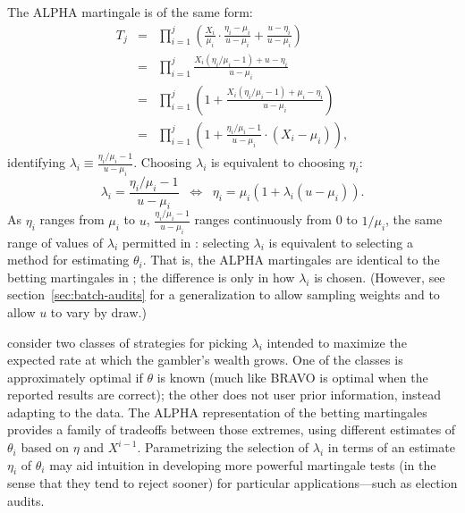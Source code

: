 \documentclass[12pt,runningheads]{llncs}
\begin{document}
{The ALPHA martingale is of the same form:
\begin{eqnarray} \label{eq:lambda-form}
T_j &=& \prod_{i=1}^j \left ( \frac{X_i}{\mu_i} \cdot \frac{\eta_i-\mu_i}{u-\mu_i} + \frac{u-\eta_i}{u-\mu_i} \right ) \nonumber \\
&=& \prod_{i=1}^j \frac{X_i (\eta_i/\mu_i -1) + u - \eta_i}{u-\mu_i} \nonumber \\
&=& \prod_{i=1}^j \left ( 1 + \frac{X_i (\eta_i/\mu_i -1) + \mu_i - \eta_i}{u-\mu_i} \right ) \nonumber \\
&=&  \prod_{i=1}^j \left ( 1 + \frac{\eta_i/\mu_i -1}{u-\mu_i} \cdot (X_i - \mu_i) \right ),
\end{eqnarray}
identifying $\lambda_i \equiv \frac{\eta_i/\mu_i -1}{u-\mu_i}$.
Choosing $\lambda_i$ is equivalent to choosing $\eta_i$:
\begin{equation}
\lambda_i = \frac{\eta_i/\mu_i -1}{u-\mu_i} \;\; \Longleftrightarrow \;\; \eta_i = \mu_i \left ( 1 + \lambda_i (u-\mu_i) \right ).
\end{equation}
As $\eta_i$ ranges from $\mu_i$ to $u$, $\frac{\eta_i/\mu_i -1}{u-\mu_i}$ ranges continuously from
0 to $1/\mu_i$, the same range of values of $\lambda_i$ permitted in \cite{waudby-smithRamdas21,waudby-smithEtal21}:
selecting $\lambda_i$ is equivalent to selecting a method for estimating $\theta_i$.
That is, the ALPHA martingales are identical to the betting martingales in \cite{waudby-smithRamdas21,waudby-smithEtal21};
the difference is only in how $\lambda_i$ is chosen.
(However, see section~\ref{sec:batch-audits} for a generalization to allow sampling weights and to allow $u$ to
vary by draw.)

\cite{waudby-smithRamdas21,waudby-smithEtal21} consider two classes of strategies for picking $\lambda_i$ 
intended to maximize the expected rate at which the gambler's wealth grows. 
One of the classes is approximately optimal if $\theta$ is known (much like BRAVO is optimal when
the reported results are correct); the other does not user prior information,
instead adapting to the data.
The ALPHA representation of the betting martingales provides a family of tradeoffs between those 
extremes, using different estimates
of $\theta_i$ based on $\eta$ and $X^{i-1}$.
Parametrizing the selection of $\lambda_i$ in terms of an estimate $\eta_i$ of $\theta_i$ 
may aid intuition in developing
more powerful martingale tests (in the sense that they tend to reject sooner) 
for particular applications---such as election audits.

}
\end{document}
